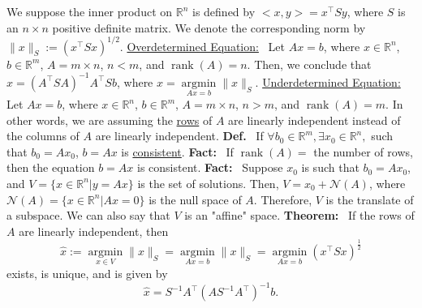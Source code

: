\documentclass[letterpaper]{article}
\newcommand{\real}{\mathbb R}  %
\begin{document}
We suppose the inner product on $\real^n$ is defined by $<x,y> = x^\top Sy$, where $S$ is an $n\times n$ positive definite matrix. We denote the corresponding norm by $\|x\|_S := (x^\top S x)^{1/2}$.
    \newline\newline
    \underline{Overdetermined Equation:}~
        \newline
        Let $Ax = b$, where $x \in \mathbb{R}^n$, $b\in \mathbb{R}^m$, $A=m\times n$, $n<m$, and $\operatorname{rank}(A)=n$.
        \newline
        Then, we conclude that $\hat{x}=\left(A^\top  SA\right)^{-1}A^\top  Sb$, where $\hat{x}=\underset{Ax=b}{\operatorname{argmin}}\|x\|_S$.
    \newline\newline
    \underline{Underdetermined Equation:}
        \newline
        Let $Ax = b$, where $x \in \mathbb{R}^n$, $b\in \mathbb{R}^m$, $A=m\times n$, $n>m$, and $\operatorname{rank}(A)=m$. In other words, we are assuming the \underline{rows} of $A$ are linearly independent instead of the columns of $A$ are linearly independent.
        \newline\newline
        \textbf{Def.}~ If $\forall  b_0 \in \mathbb{R}^m, \exists  x_0 \in \mathbb{R}^n,$ such that $b_0 = Ax_0$, $b=Ax$ is \underline{consistent}.
        \newline\newline
        \textbf{Fact:}~ If $\operatorname{\operatorname{rank}}(A)=$ the number of rows, then the equation $b = Ax$ is consistent.
        \newline\newline
        \textbf{Fact:}~ Suppose $x_0$ is such that $b_0 = Ax_0$, and $V=\{x \in \mathbb{R}^n | y = Ax\}$ is the set of solutions. Then, $V = x_0 + \mathcal{N}(A)$, where $\mathcal{N}(A)=\{x \in \mathbb{R}^n | Ax=0\}$ is the null space of $A$. Therefore, $V$ is the translate of a subspace. We can also say that $V$ is an "affine" space.
        \newline\newline
        \textbf{Theorem:}~ If the rows of $A$ are linearly independent, then
        \begin{equation*}
            \hat{x} := \underset{ x \in V} {\operatorname{argmin}} \|x\|_S = \underset{ Ax=b} {\operatorname{argmin}} \|x\|_S = \underset{ Ax = b} {\operatorname{argmin}} (x^\top Sx)^{\frac{1}{2}}
        \end{equation*}
        exists, is unique,  and is given by
        \begin{equation*}
            \hat{x} = S^{-1} A^\top  \left(AS^{-1} A^\top \right)^{-1} b.
        \end{equation*}
\end{document}
